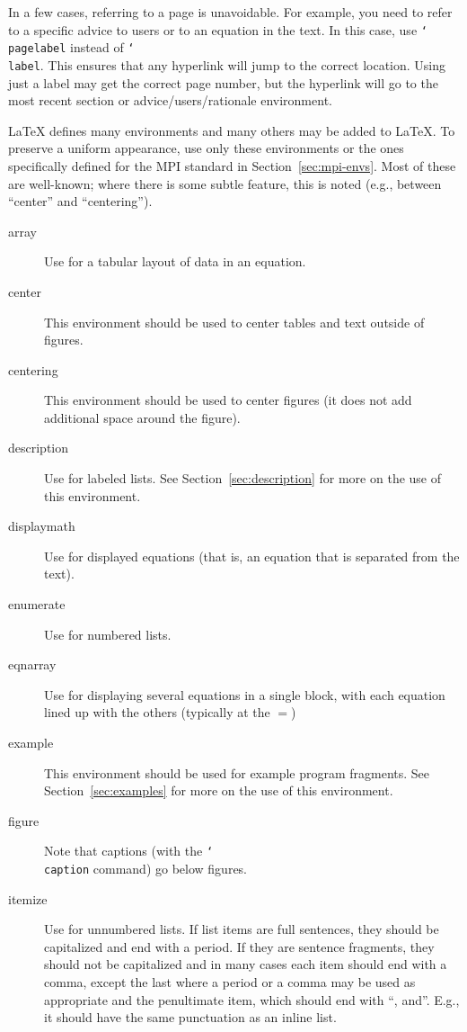 \documentclass[letterpaper,twoside,11pt,fleqn]{article}
\def\cmd#1{\texttt{\char`\\#1}}
\def\MPI/{\textsf{MPI}}    %
\begin{document}
In a few cases, referring to a page is unavoidable.
For example, you need to refer to a specific advice to users or to an
equation in the text.
In this case, use \cmd{pagelabel} instead of \cmd{label}.
This ensures that any hyperlink will jump to the correct location.
Using just a label may get the correct page number, but the hyperlink will go
to the most recent section or advice/users/rationale environment.

LaTeX defines many environments and many others may be added to
LaTeX.  To preserve a uniform appearance, use only these environments
or the ones specifically defined for the \MPI/ standard in
Section~\ref{sec:mpi-envs}.  Most
of these are well-known; where there is some subtle feature, this is
noted (e.g., between ``center'' and ``centering'').
\begin{description}
\item[array]Use for a tabular layout of data in an equation.
\item[center]This environment should be used to center tables and text
  outside of figures.
\item[centering]This environment should be used to center figures (it
  does not add additional space around the figure).
\item[description]Use for labeled lists. See
  Section~\ref{sec:description} for more on the use of this environment.
\item[displaymath]Use for displayed equations (that is, an equation
  that is separated from the text).
\item[enumerate]Use for numbered lists.
\item[eqnarray]Use for displaying several equations in a single block,
  with each equation lined up with the others (typically at the $=$)
\item[example]This environment should be used for example program
  fragments. See Section~\ref{sec:examples} for more on the use of
  this environment.
\item[figure]Note that captions (with the \cmd{caption} command) go
  below figures.
\item[itemize]Use for unnumbered lists. If list items are full
  sentences, they should be capitalized and end with a period. If they
  are sentence fragments, they should not be capitalized and in many
  cases each item should end with a comma, except the last where a
  period or a comma may be used as appropriate and the penultimate
  item, which should end with ``, and''. E.g., it should have the same
  punctuation as an inline list.

\end{description}
\end{document}

